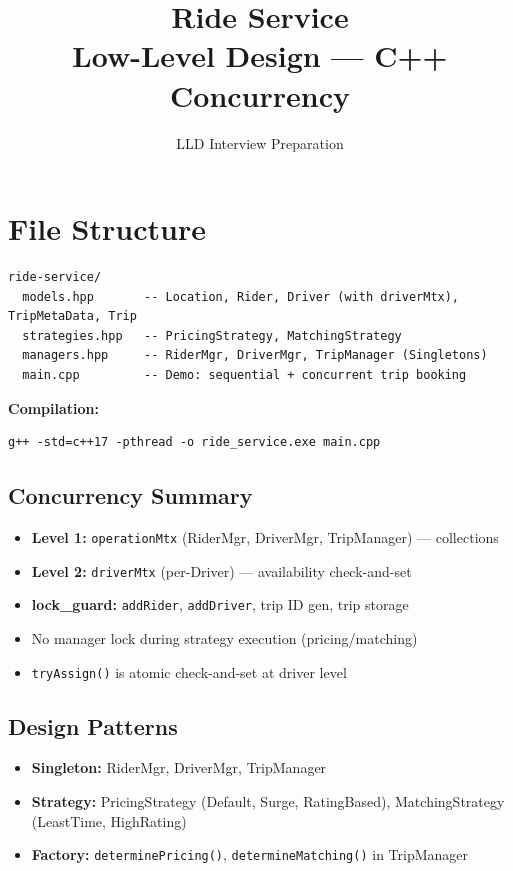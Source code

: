 \documentclass[11pt,a4paper]{article}
\title{\Huge\textbf{Ride Service}\\[0.3em]\Large Low-Level Design --- C++ Concurrency}
\author{LLD Interview Preparation}
\date{}
\begin{document}
\maketitle
\tableofcontents
\newpage

\section{File Structure}
\begin{verbatim}
ride-service/
  models.hpp       -- Location, Rider, Driver (with driverMtx), TripMetaData, Trip
  strategies.hpp   -- PricingStrategy, MatchingStrategy
  managers.hpp     -- RiderMgr, DriverMgr, TripManager (Singletons)
  main.cpp         -- Demo: sequential + concurrent trip booking
\end{verbatim}

\textbf{Compilation:}
\begin{verbatim}
g++ -std=c++17 -pthread -o ride_service.exe main.cpp
\end{verbatim}

\subsection{Concurrency Summary}
\begin{itemize}
    \item \textbf{Level 1:} \texttt{operationMtx} (RiderMgr, DriverMgr, TripManager) --- collections
    \item \textbf{Level 2:} \texttt{driverMtx} (per-Driver) --- availability check-and-set
    \item \textbf{lock\_guard:} \texttt{addRider}, \texttt{addDriver}, trip ID gen, trip storage
    \item No manager lock during strategy execution (pricing/matching)
    \item \texttt{tryAssign()} is atomic check-and-set at driver level
\end{itemize}

\subsection{Design Patterns}
\begin{itemize}
    \item \textbf{Singleton:} RiderMgr, DriverMgr, TripManager
    \item \textbf{Strategy:} PricingStrategy (Default, Surge, RatingBased), MatchingStrategy (LeastTime, HighRating)
    \item \textbf{Factory:} \texttt{determinePricing()}, \texttt{determineMatching()} in TripManager
\end{itemize}
\end{document}
